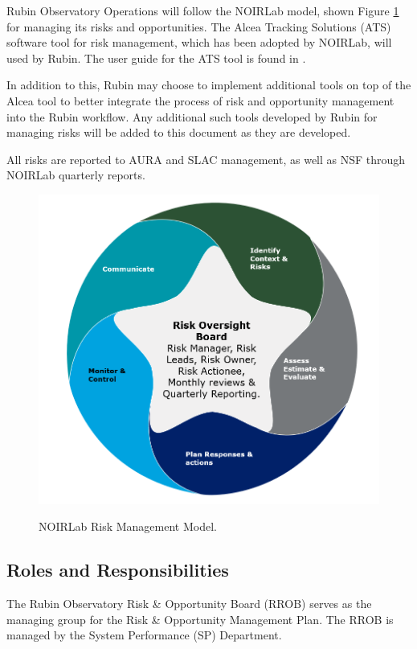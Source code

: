 Rubin Observatory Operations will follow the NOIRLab model, shown Figure \ref{fig:NOIRLab-risk-model} for managing its risks and opportunities. 
The Alcea Tracking Solutions (ATS) software tool for risk management, which has been adopted by NOIRLab, will used by Rubin.
The user guide for the ATS tool is found in .

In addition to this, Rubin may choose to implement additional tools on top of the Alcea tool to better integrate the process of risk and opportunity management into the Rubin workflow. 
Any additional such tools developed by Rubin for managing risks will be added to this document as they are developed. 
 
All risks are reported to AURA and SLAC management, as well as NSF through NOIRLab quarterly reports.

\begin{figure}[t]
\caption{NOIRLab Risk Management Model.}
\centering
\includegraphics[width=\textwidth]{NOIRLab-risk-model-temp}
\label{fig:NOIRLab-risk-model}
\end{figure}


\subsection{Roles and Responsibilities}

The Rubin Observatory Risk \& Opportunity Board (RROB) serves as the managing group for the Risk \& Opportunity Management Plan.
The RROB is managed by the System Performance (SP) Department.

